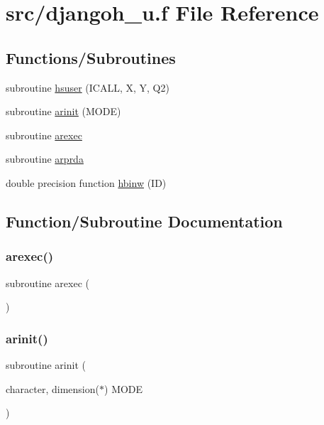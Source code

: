 \hypertarget{djangoh__u_8f}{}\section{src/djangoh\+\_\+u.f File Reference}
\label{djangoh__u_8f}
\subsection*{Functions/\+Subroutines}
\begin{DoxyCompactItemize}
\item 
subroutine \hyperlink{djangoh__u_8f_a96d7acf0122c4a21c1d461d27da11680}{hsuser} (I\+C\+A\+LL, X, Y, Q2)
\item 
subroutine \hyperlink{djangoh__u_8f_a6eff116680f2c31838b816f026b6bc4b}{arinit} (M\+O\+DE)
\item 
subroutine \hyperlink{djangoh__u_8f_a3fb9648a29b61ff83c5d5109273d1d2f}{arexec}
\item 
subroutine \hyperlink{djangoh__u_8f_a419b2d89c04c8355a7b8cb1b39c2eaae}{arprda}
\item 
double precision function \hyperlink{djangoh__u_8f_af22db7eb1d03f2627c021608064d87dc}{hbinw} (ID)
\end{DoxyCompactItemize}


\subsection{Function/\+Subroutine Documentation}
\mbox{\label{djangoh__u_8f_a3fb9648a29b61ff83c5d5109273d1d2f}} 
\subsubsection{\texorpdfstring{arexec()}{arexec()}}
{\footnotesize\ttfamily subroutine arexec (\begin{DoxyParamCaption}{ }\end{DoxyParamCaption})}

\mbox{\label{djangoh__u_8f_a6eff116680f2c31838b816f026b6bc4b}} 
\subsubsection{\texorpdfstring{arinit()}{arinit()}}
{\footnotesize\ttfamily subroutine arinit (\begin{DoxyParamCaption}\item[{character, dimension($\ast$)}]{M\+O\+DE }\end{DoxyParamCaption})}

